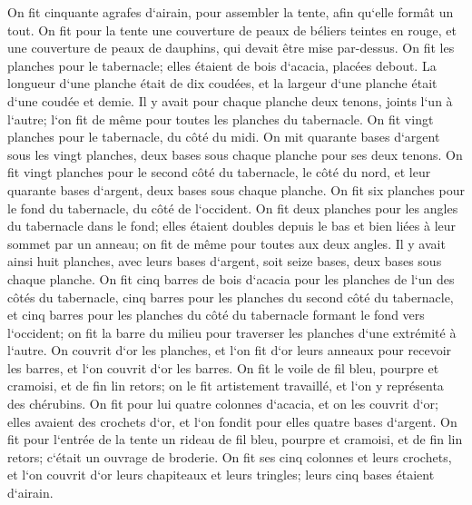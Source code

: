 \verse On fit cinquante agrafes d`airain, pour assembler la tente, afin qu`elle formât un tout. 
\verse On fit pour la tente une couverture de peaux de béliers teintes en rouge, et une couverture de peaux de dauphins, qui devait être mise par-dessus. 
\verse On fit les planches pour le tabernacle; elles étaient de bois d`acacia, placées debout. 
\verse La longueur d`une planche était de dix coudées, et la largeur d`une planche était d`une coudée et demie. 
\verse Il y avait pour chaque planche deux tenons, joints l`un à l`autre; l`on fit de même pour toutes les planches du tabernacle. 
\verse On fit vingt planches pour le tabernacle, du côté du midi. 
\verse On mit quarante bases d`argent sous les vingt planches, deux bases sous chaque planche pour ses deux tenons. 
\verse On fit vingt planches pour le second côté du tabernacle, le côté du nord, 
\verse et leur quarante bases d`argent, deux bases sous chaque planche. 
\verse On fit six planches pour le fond du tabernacle, du côté de l`occident. 
\verse On fit deux planches pour les angles du tabernacle dans le fond; 
\verse elles étaient doubles depuis le bas et bien liées à leur sommet par un anneau; on fit de même pour toutes aux deux angles. 
\verse Il y avait ainsi huit planches, avec leurs bases d`argent, soit seize bases, deux bases sous chaque planche. 
\verse On fit cinq barres de bois d`acacia pour les planches de l`un des côtés du tabernacle, 
\verse cinq barres pour les planches du second côté du tabernacle, et cinq barres pour les planches du côté du tabernacle formant le fond vers l`occident; 
\verse on fit la barre du milieu pour traverser les planches d`une extrémité à l`autre. 
\verse On couvrit d`or les planches, et l`on fit d`or leurs anneaux pour recevoir les barres, et l`on couvrit d`or les barres. 
\verse On fit le voile de fil bleu, pourpre et cramoisi, et de fin lin retors; on le fit artistement travaillé, et l`on y représenta des chérubins. 
\verse On fit pour lui quatre colonnes d`acacia, et on les couvrit d`or; elles avaient des crochets d`or, et l`on fondit pour elles quatre bases d`argent. 
\verse On fit pour l`entrée de la tente un rideau de fil bleu, pourpre et cramoisi, et de fin lin retors; c`était un ouvrage de broderie. 
\verse On fit ses cinq colonnes et leurs crochets, et l`on couvrit d`or leurs chapiteaux et leurs tringles; leurs cinq bases étaient d`airain. 

\chapter{}

